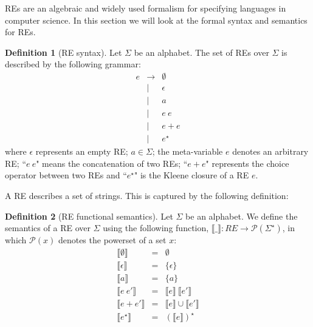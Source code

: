 \documentclass[oneside,12pt]{scrbook}
\theoremstyle{definition}
\newcommand{\sembrackets}[1]{\ensuremath{\llbracket #1 \rrbracket}}
\theoremstyle{plain}
\theoremstyle{definition}
\newtheorem{Definition}{Definition}
\begin{document}
REs are an algebraic and widely used formalism for specifying languages in computer science.
In this section we will look at the formal syntax and semantics for REs.

\begin{Definition}[RE syntax]
	\label{REexpressionsyntax}
	Let $\Sigma$ be an alphabet. The set of REs over $\Sigma$ is described by the following grammar:
	\begin{equation*}
	\begin{array}{lcl}
	e & \to  & \emptyset \\
	& \mid & \epsilon  \\
	& \mid & a         \\
	& \mid & e \: e    \\
	& \mid & e + e     \\
	& \mid & e^\star
	\end{array}
	\end{equation*}
	where $\epsilon$ represents an empty RE; $a\in\Sigma$; the meta-variable $e$ denotes an arbitrary RE; ``$e\:e$" means the concatenation of two REs; ``$e + e$" represents the choice operator between two REs and ``$e^\star$" is the Kleene closure of a RE $e$.
\end{Definition}

A RE describes a set of strings. This is captured by the following definition:

\begin{Definition}[RE functional semantics]
	Let $\Sigma$ be an alphabet. We define the semantics of a RE over $\Sigma$
	using the following function, $\sembrackets{\_} : RE \to
	\mathcal{P}(\Sigma^\star)$, in which $\mathcal{P}(x)$ denotes the powerset of a set $x$:
	\begin{equation*}
	\begin{array}{lcl}
	\sembrackets{\emptyset} & = & \emptyset \\
	\sembrackets{\epsilon}  & = & \{\epsilon\} \\
	\sembrackets{a}         & = & \{a\} \\
	\sembrackets{e\:e'}     & = & \sembrackets{e}\:\sembrackets{e'} \\
	\sembrackets{e + e'}    & = & \sembrackets{e}\cup\sembrackets{e'} \\
	\sembrackets{e^\star}   & = & (\sembrackets{e})^\star \\
	\end{array}
	\end{equation*}
\end{Definition}
\end{document}
